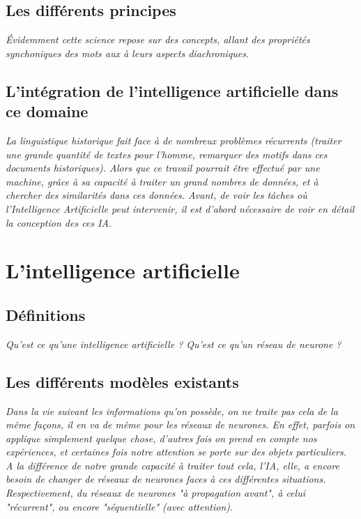 \documentclass[12pt, letterpaper]{report}
\begin{document}
\subsection{Les différents principes}
\textit{Évidemment cette science repose sur des concepts, allant des propriétés synchoniques des mots aux à leurs aspects diachroniques.}
\subsection{L'intégration de l'intelligence artificielle dans ce domaine}
\textit{La linguistique historique fait face à de nombreux problèmes récurrents (traiter une grande quantité de textes pour l'homme, remarquer des motifs dans ces documents historiques). Alors que ce travail pourrait être effectué par une machine, grâce à sa capacité à traiter un grand nombres de données, et à chercher des similarités dans ces données. Avant, de voir les tâches où l'Intelligence Artificielle peut intervenir, il est d'abord nécessaire de voir en détail la conception des ces IA.}
\section{L'intelligence artificielle}
\subsection{Définitions}
\textit{Qu'est ce qu'une intelligence artificielle ? Qu'est ce qu'un réseau de neurone ?}
\subsection{Les différents modèles existants}
\textit{Dans la vie suivant les informations qu'on possède, on ne traite pas cela de la même façons, il en va de même pour les réseaux de neurones. En effet, parfois on applique simplement quelque chose, d'autres fois on prend en compte nos expériences, et certaines fois notre attention se porte sur des objets particuliers. A la différence de notre grande capacité à traiter tout cela, l'IA, elle, a encore besoin de changer de réseaux de neurones faces à ces différentes situations. Respectivement, du réseaux de neurones "à propagation avant", à celui "récurrent", ou encore "séquentielle" (avec attention).}
\end{document}
